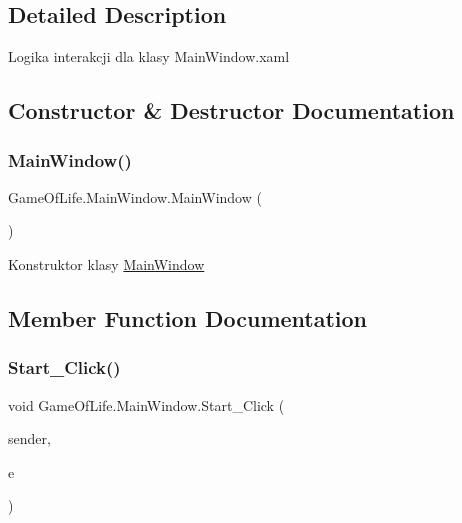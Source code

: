 \subsection{Detailed Description}
Logika interakcji dla klasy Main\+Window.\+xaml 



\subsection{Constructor \& Destructor Documentation}
\mbox{\label{class_game_of_life_1_1_main_window_a20edd6a1a783f5298ba41a0f79411d66}} 
\subsubsection{\texorpdfstring{MainWindow()}{MainWindow()}}
{\footnotesize\ttfamily Game\+Of\+Life.\+Main\+Window.\+Main\+Window (\begin{DoxyParamCaption}{ }\end{DoxyParamCaption})\hspace{0.3cm}{\ttfamily [inline]}}



Konstruktor klasy \mbox{\hyperlink{class_game_of_life_1_1_main_window}{Main\+Window}} 



\subsection{Member Function Documentation}
\mbox{\label{class_game_of_life_1_1_main_window_af30e42841457231f265f246c8e6ecdb9}} 
\subsubsection{\texorpdfstring{Start\_Click()}{Start\_Click()}}
{\footnotesize\ttfamily void Game\+Of\+Life.\+Main\+Window.\+Start\+\_\+\+Click (\begin{DoxyParamCaption}\item[{object}]{sender,  }\item[{Routed\+Event\+Args}]{e }\end{DoxyParamCaption})\hspace{0.3cm}{\ttfamily [inline]}}




